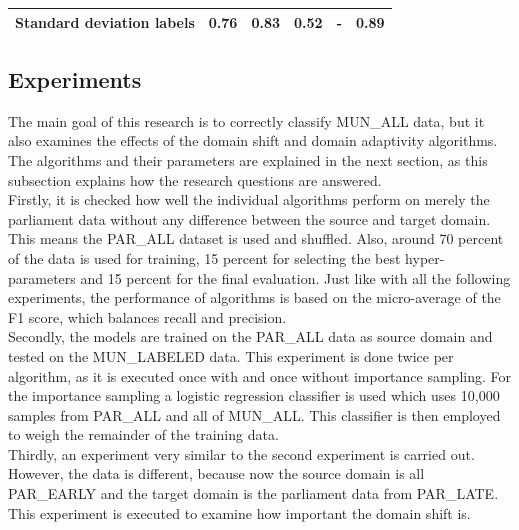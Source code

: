 \begin{table}[H]
{\begin{tabular}{cccccc}
\footnotesize \textbf{Standard deviation labels} &\footnotesize  0.76                                                                                      & \footnotesize 0.83                                                                                      & \footnotesize 0.52                                                                                      & \footnotesize - & \footnotesize 0.89                                                                                                                                   \\ \bottomrule
 \end{tabular}}
\end{table}







\subsection{Experiments}
The main goal of this research is to correctly classify MUN\_ALL data, but it also examines the effects of the domain shift and domain adaptivity algorithms. The algorithms and their parameters are explained in the next section, as this subsection explains how the research questions are answered. \\
Firstly, it is checked how well the individual algorithms perform on merely the parliament data without any difference between the source and target domain. This means the PAR\_ALL dataset is used and shuffled. Also, around 70 percent of the data is used for training, 15 percent for selecting the best hyper-parameters and 15 percent for the final evaluation. Just like with all the following experiments, the performance of algorithms is based on the micro-average of the F1 score, which balances recall and precision. \\
Secondly, the models are trained on the PAR\_ALL data as source domain and tested on the MUN\_LABELED data. This experiment is done twice per algorithm, as it is executed once with and once without importance sampling. For the importance sampling a logistic regression classifier is used which uses 10,000 samples from PAR\_ALL and all of MUN\_ALL. This classifier is then employed to weigh the remainder of the training data. \\
Thirdly, an experiment very similar to the second experiment is carried out. However, the data is different, because now the source domain is all PAR\_EARLY and the target domain is the parliament data from PAR\_LATE. This experiment is executed to examine how important the domain shift is. 

